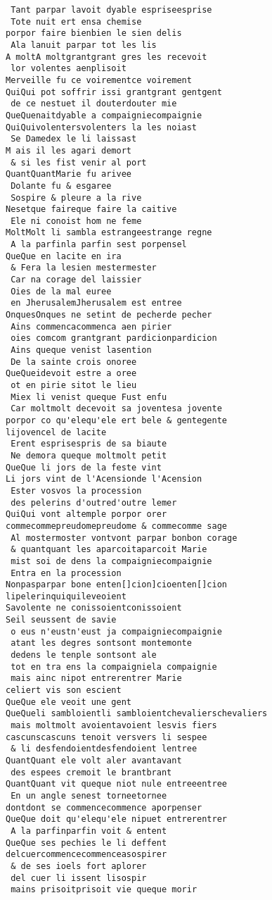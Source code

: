 \documentclass[
  letterpaper,
  DIV=11,
  numbers=noendperiod]{scrreprt}
\begin{document}
\begin{verbatim}
 Tant parpar lavoit dyable espriseesprise
 Tote nuit ert ensa chemise
porpor faire bienbien le sien delis
 Ala lanuit parpar tot les lis
A moltA moltgrantgrant gres les recevoit
 lor volentes aenplisoit
Merveille fu ce voirementce voirement
QuiQui pot soffrir issi grantgrant gentgent
 de ce nestuet il douterdouter mie
QueQuenaitdyable a compaigniecompaignie
QuiQuivolentersvolenters la les noiast
 Se Damedex le li laissast
M ais il les agari demort
 & si les fist venir al port
QuantQuantMarie fu arivee
 Dolante fu & esgaree
 Sospire & pleure a la rive
Nesetque faireque faire la caitive
 Ele ni conoist hom ne feme
MoltMolt li sambla estrangeestrange regne
 A la parfinla parfin sest porpensel
QueQue en lacite en ira
 & Fera la lesien mestermester
 Car na corage del laissier
 Oies de la mal euree
 en JherusalemJherusalem est entree
OnquesOnques ne setint de pecherde pecher
 Ains commencacommenca aen pirier
 oies comcom grantgrant pardicionpardicion
 Ains queque venist lasention
 De la sainte crois onoree
QueQueidevoit estre a oree
 ot en pirie sitot le lieu
 Miex li venist queque Fust enfu
 Car moltmolt decevoit sa joventesa jovente
porpor co qu'elequ'ele ert bele & gentegente
lijovencel de lacite
 Erent esprisespris de sa biaute
 Ne demora queque moltmolt petit
QueQue li jors de la feste vint
Li jors vint de l'Acensionde l'Acension
 Ester vosvos la procession
 des pelerins d'outred'outre lemer
QuiQui vont altemple porpor orer
commecommepreudomepreudome & commecomme sage
 Al mostermoster vontvont parpar bonbon corage
 & quantquant les aparcoitaparcoit Marie
 mist soi de dens la compaigniecompaignie
 Entra en la procession
Nonpasparpar bone enten[]cion]cioenten[]cion
lipelerinquiquileveoient
Savolente ne conissoientconissoient
Seil seussent de savie
 o eus n'eustn'eust ja compaigniecompaignie
 atant les degres sontsont montemonte
 dedens le tenple sontsont ale
 tot en tra ens la compaigniela compaignie
 mais ainc nipot entrerentrer Marie
celiert vis son escient
QueQue ele veoit une gent
QueQueli sambloientli sambloientchevalierschevaliers
 mais moltmolt avoientavoient lesvis fiers
cascunscascuns tenoit versvers li sespee
 & li desfendoientdesfendoient lentree
QuantQuant ele volt aler avantavant
 des espees cremoit le brantbrant
QuantQuant vit queque niot nule entreeentree
 En un angle senest torneetornee
dontdont se commencecommence aporpenser
QueQue doit qu'elequ'ele nipuet entrerentrer
 A la parfinparfin voit & entent
QueQue ses pechies le li deffent
delcuercommencecommenceasospirer
 & de ses ioels fort aplorer
 del cuer li issent lisospir
 mains prisoitprisoit vie queque morir

\end{verbatim}
\end{document}
